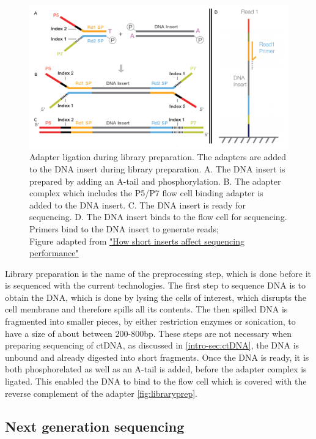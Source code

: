 \begin{figure}[!th]
\centering
\includegraphics[width=.9\linewidth]{Figures/LibraryPreparation.png}
\caption[Library preparation for NGS]{Adapter ligation during library preparation. The adapters are added to the DNA insert during library preparation. A. The DNA insert is prepared by adding an A-tail and phosphorylation. B. The adapter complex which includes the P5/P7 flow cell binding adapter is added to the DNA insert. C. The DNA insert is ready for sequencing. D. The DNA insert binds to the flow cell for sequencing. Primers bind to the DNA insert to generate reads; \\Figure adapted from \href{https://sapac.support.illumina.com/bulletins/2020/12/how-short-inserts-affect-sequencing-performance.html}{"How short inserts affect sequencing performance"}\protect\cite{Illumina2020}}\label{fig:libraryprep}
\end{figure}

Library preparation is the name of the preprocessing step, which is done before it is sequenced with the current technologies. The first step to sequence DNA is to obtain the DNA, which is done by lysing the cells of interest, which disrupts the cell membrane and therefore spills all its contents. The then spilled DNA is fragmented into smaller pieces, by either restriction enzymes or sonication, to have a size of about between 200-800bp. These steps are not necessary when preparing sequencing of ctDNA, as discussed in \autoref{intro-sec:ctDNA}, the DNA is unbound and already digested into short fragments.
Once the DNA is ready, it is both phosphorelated as well as an A-tail is added, before the adapter complex is ligated. This enabled the DNA to bind to the flow cell which is covered with the reverse complement of the adapter \autoref{fig:libraryprep}. 

\subsection{Next generation sequencing}
\label{intro-sec:ngs}

